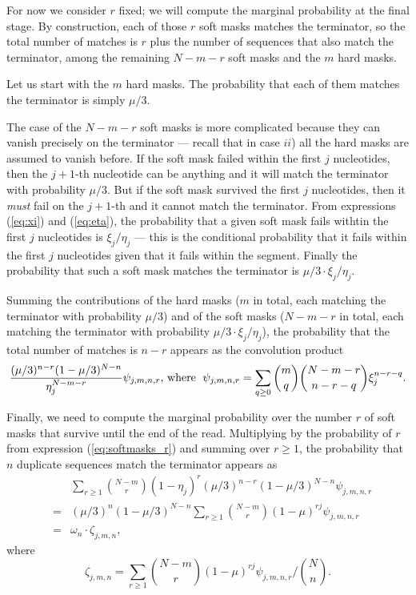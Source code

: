 \documentclass{article}
\begin{document}
For now we consider $r$ fixed; we will compute the marginal probability at
the final stage. By construction, each of those $r$ soft masks matches the
terminator, so the total number of matches is $r$ plus the number of
sequences that also match the terminator, among the remaining $N-m-r$ soft
masks and the $m$ hard masks.

Let us start with the $m$ hard masks. The probability that each of them
matches the terminator is simply $\mu/3$.

The case of the $N-m-r$ soft masks is more complicated because they can
vanish precisely on the terminator --- recall that in case $ii$) all the
hard masks are assumed to vanish before. If the soft mask failed within
the first $j$ nucleotides, then the $j+1$-th nucleotide can be anything
and it will match the terminator with probability $\mu/3$. But if the soft
mask survived the first $j$ nucleotides, then it \emph{must} fail on the
$j+1$-th and it cannot match the terminator. From expressions
(\ref{eq:xi}) and (\ref{eq:eta}), the probability that a given soft mask
fails withtin the first $j$ nucleotides is $\xi_j/\eta_j$ --- this is the
conditional probability that it fails within the first $j$ nucleotides
given that it fails within the segment. Finally the probability that such
a soft mask matches the terminator is $\mu/3 \cdot \xi_j / \eta_j$.

Summing the contributions of the hard masks ($m$ in total, each matching
the terminator with probability $\mu/3$) and of the soft masks ($N-m-r$ in
total, each matching the terminator with probability
$\mu/3\cdot\xi_j/\eta_j$), the probability that the total number of
matches is $n-r$ appears as the convolution product
\begin{equation*}
\frac{(\mu/3)^{n-r}(1-\mu/3)^{N-n}}{\eta_j^{N-m-r}}
\psi_{j,m,n,r}\text{, where \;}
\psi_{j,m,n,r} = \sum_{q \geq 0}{m \choose q}{N-m-r \choose n-r-q}
\xi_j^{n-r-q}.
\end{equation*}

Finally, we need to compute the marginal probability over the number $r$
of soft masks that survive until the end of the read. Multiplying by the
probability of $r$ from expression (\ref{eq:softmasks_r}) and summing over
$r \geq 1$, the probability that $n$ duplicate sequences match the
terminator appears as
\begin{eqnarray*}
&\;& \sum_{r\geq1} {N-m \choose r}
(1 - \eta_j)^r (\mu/3)^{n-r} (1-\mu/3)^{N-n} \psi_{j,m,n,r} \\
&=& (\mu/3)^n(1-\mu/3)^{N-n} \sum_{r\geq1} {N-m \choose r}
  (1 - \mu)^{rj} \psi_{j,m,n,r} \\
&=& \omega_n \cdot \zeta_{j,m,n},
\end{eqnarray*}
where
\begin{equation}
\label{eq:zeta}
\zeta_{j,m,n} = \sum_{r\geq1} {N-m \choose r}
(1-\mu)^{rj} \psi_{j,m,n,r} \bigg/ {N \choose n}.
\end{equation}
\end{document}
